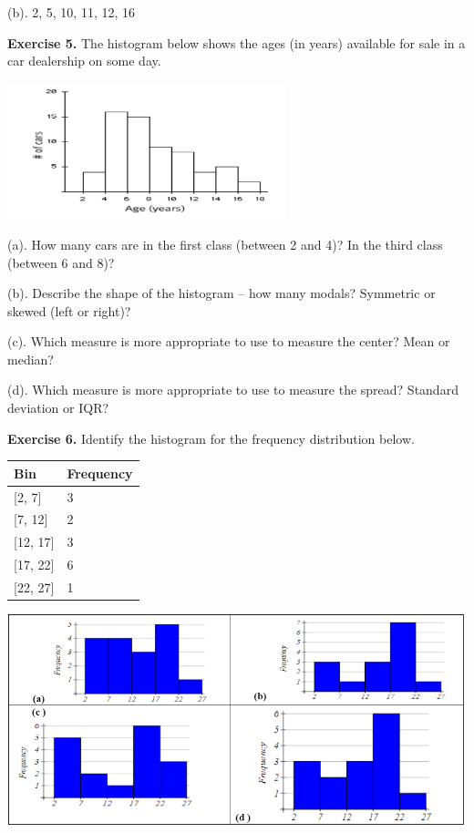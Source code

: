 \documentclass[
]{book}
\begin{document}
(b). 2, 5, 10, 11, 12, 16

\textbf{Exercise 5.} The histogram below shows the ages (in years) available for sale in a car dealership on some day.

\includegraphics[width=3.17708in,height=\textheight]{images/img24.png}

(a). How many cars are in the first class (between 2 and 4)? In the third class (between 6 and 8)?

(b). Describe the shape of the histogram -- how many modals? Symmetric or skewed (left or right)?

(c). Which measure is more appropriate to use to measure the center? Mean or median?

(d). Which measure is more appropriate to use to measure the spread? Standard deviation or IQR?

\textbf{Exercise 6.} Identify the histogram for the frequency distribution below.

\begin{longtable}[]{@{}ll@{}}
\toprule\noalign{}
Bin & Frequency \\
\midrule\noalign{}
\endhead
\bottomrule\noalign{}
\endlastfoot
{[}2, 7{]} & 3 \\
{[}7, 12{]} & 2 \\
{[}12, 17{]} & 3 \\
{[}17, 22{]} & 6 \\
{[}22, 27{]} & 1 \\
\end{longtable}

\includegraphics[width=5.63542in,height=\textheight]{images/img26.png}
\end{document}
